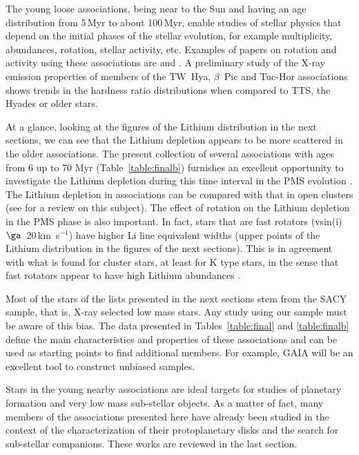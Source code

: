 \documentclass[11pt,twoside]{book}
\begin{document}
The young loose associations, being near to the Sun and having an age
distribution from 5\,Myr to about 100\,Myr,
enable studies of stellar physics that depend on the initial phases of the
stellar evolution, for example multiplicity, abundances, rotation, stellar activity, etc.
Examples of papers on rotation and activity using these associations are
\citet{delareza04} and \citet{scholz07}.
A preliminary study \citep{kastner03} of the X-ray emission properties of members of the
TW~Hya, $\beta$~Pic and Tuc-Hor associations shows trends in the hardness ratio
distributions when compared to TTS, the Hyades or older stars.

At a glance, looking at the figures of the Lithium distribution in the next sections,
we can see that the Lithium depletion appears to be more scattered in the older associations.
The present collection of several associations with ages from 6 up to 70 Myr (Table~\ref{table:finalb})
furnishes an excellent opportunity to investigate the Lithium depletion
during this time interval in the PMS evolution \citep{silva08}.
The Lithium depletion in associations can be compared with that in open clusters
(see \citet{jeffries06} for a review on this subject).
The effect of rotation on the Lithium depletion in the PMS phase is also important.
In fact, stars that are fast rotators (vsin(i)~$\ga$~20\,km~s$^{-1}$)
have higher Li line equivalent widths (upper points of the Lithium distribution
in the figures of the next sections).
This is in agreement with what is found for cluster stars,
at least for K type stars, in the sense that fast rotators
appear to have high Lithium abundances \citep{jeffries06}.

Most of the stars of the lists presented in the next sections stem from the
SACY sample, that is, X-ray selected low mass stars.
Any study using our sample must be aware of this bias.
The data presented in Tables~\ref{table:final} and \ref{table:finalb}
define the main characteristics and properties of these associations and can be
used as starting points to find additional members.
For example, GAIA will be an excellent tool to construct unbiased samples.

Stars in the young nearby associations  are ideal targets for studies of
planetary formation and very low mass sub-stellar objects.
As a matter of fact, many members of the associations presented here
have already been  studied in the context of the characterization of their protoplanetary disks
and the search for sub-stellar companions.
These works are reviewed in the last section.
\end{document}
